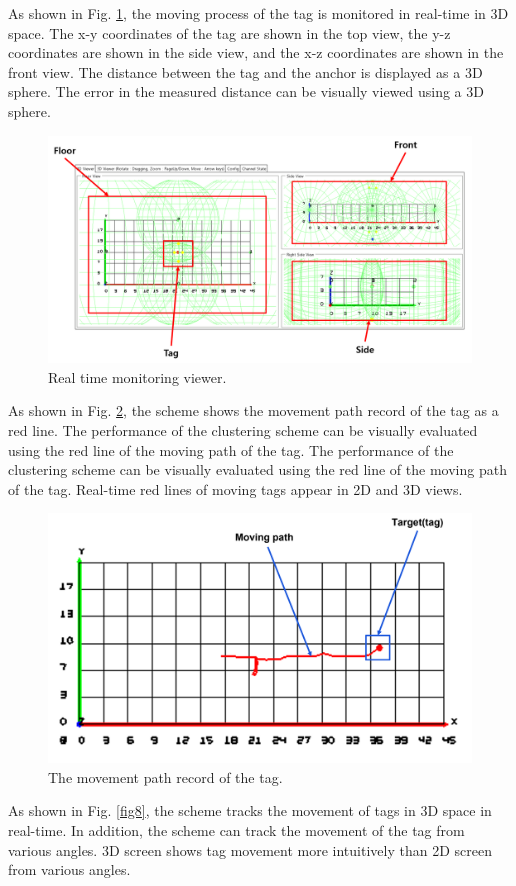 \documentclass[conference]{IEEEtran}
\begin{document}
As shown in Fig. \ref{fig6}, the moving process of the tag is monitored in real-time in 3D space. The x-y coordinates of the tag are shown in the top view, the y-z coordinates are shown in the side view, and the x-z coordinates are shown in the front view. The distance between the tag and the anchor is displayed as a 3D sphere. The error in the measured distance can be visually viewed using a 3D sphere.

\begin{figure}[htbp]
    \centerline{\includegraphics[width=0.62\columnwidth]{fig6.png}}
    \caption{Real time monitoring viewer.}
    \label{fig6}
\end{figure}

As shown in Fig. \ref{fig7}, the scheme shows the movement path record of the tag as a red line. The performance of the clustering scheme can be visually evaluated using the red line of the moving path of the tag. The performance of the clustering scheme can be visually evaluated using the red line of the moving path of the tag. Real-time red lines of moving tags appear in 2D and 3D views.

\begin{figure}[htbp]
    \centerline{\includegraphics[width=0.62\columnwidth]{fig7.png}}
    \caption{The movement path record of the tag.}
    \label{fig7}
\end{figure}

As shown in Fig. \ref{fig8}, the scheme tracks the movement of tags in 3D space in real-time. In addition, the scheme can track the movement of the tag from various angles. 3D screen shows tag movement more intuitively than 2D screen from various angles.
\end{document}
